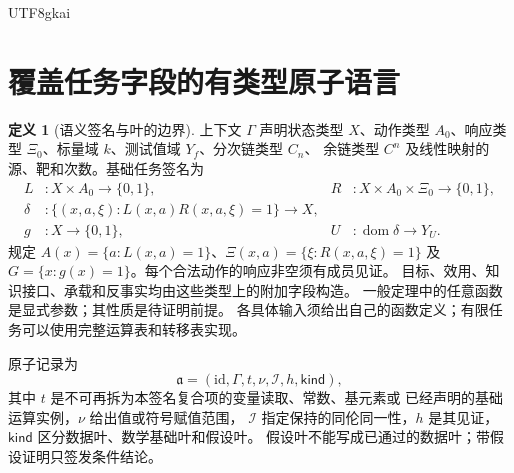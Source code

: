 \documentclass[12pt]{report}
\theoremstyle{definition}
\newtheorem{definition}{定义}[chapter]
\begin{document}
\begin{CJK*}{UTF8}{gkai}
\section{覆盖任务字段的有类型原子语言}
\label{sec:atoms}
\begin{definition}[语义签名与叶的边界]
上下文 \(\Gamma\) 声明状态类型 \(X\)、动作类型 \(A_0\)、响应类型
\(\Xi_0\)、标量域 \(k\)、测试值域 \(Y_f\)、分次链类型 \(C_n\)、
余链类型 \(C^n\) 及线性映射的源、靶和次数。基础任务签名为
\[
\begin{aligned}
L&:X\times A_0\to\{0,1\},&
R&:X\times A_0\times\Xi_0\to\{0,1\},\\
\delta&:\{(x,a,\xi):L(x,a)R(x,a,\xi)=1\}\to X,\\
g&:X\to\{0,1\},&
U&:\operatorname{dom}\delta\to Y_U .
\end{aligned}
\]
规定 \(A(x)=\{a:L(x,a)=1\}\)、\(\Xi(x,a)=\{\xi:R(x,a,\xi)=1\}\)
及 \(G=\{x:g(x)=1\}\)。每个合法动作的响应非空须有成员见证。
目标、效用、知识接口、承载和反事实均由这些类型上的附加字段构造。
一般定理中的任意函数是显式参数；其性质是待证明前提。
各具体输入须给出自己的函数定义；有限任务可以使用完整运算表和转移表实现。

原子记录为
\[
\mathfrak a=(\mathrm{id},\Gamma,t,\nu,\mathcal I,h,\mathsf{kind}),
\]
其中 \(t\) 是不可再拆为本签名复合项的变量读取、常数、基元素或
已经声明的基础运算实例，\(\nu\) 给出值或符号赋值范围，
\(\mathcal I\) 指定保持的同伦同一性，\(h\) 是其见证，
\(\mathsf{kind}\) 区分数据叶、数学基础叶和假设叶。
假设叶不能写成已通过的数据叶；带假设证明只签发条件结论。
\end{definition}


\end{CJK*}
\end{document}
